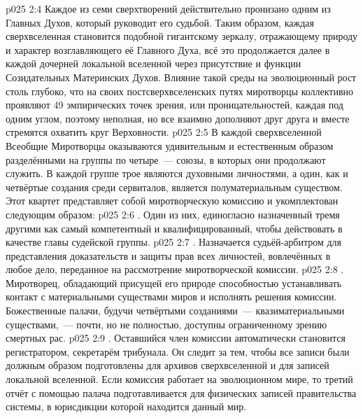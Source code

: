 \vs p025 2:4 Каждое из семи сверхтворений действительно пронизано одним из Главных Духов, который руководит его судьбой. Таким образом, каждая сверхвселенная становится подобной гигантскому зеркалу, отражающему природу и характер возглавляющего её Главного Духа, всё это продолжается далее в каждой дочерней локальной вселенной через присутствие и функции Созидательных Материнских Духов. Влияние такой среды на эволюционный рост столь глубоко, что на своих постсверхвселенских путях миротворцы коллективно проявляют 49 эмпирических точек зрения, или проницательностей, каждая под одним углом, поэтому неполная, но все взаимно дополняют друг друга и вместе стремятся охватить круг Верховности.
\vs p025 2:5 \pc В каждой сверхвселенной Всеобщие Миротворцы оказываются удивительным и естественным образом разделёнными на группы по четыре~--- союзы, в которых они продолжают служить. В каждой группе трое являются духовными личностями, а один, как и четвёртые создания среди сервиталов, является полуматериальным существом. Этот квартет представляет собой миротворческую комиссию и укомплектован следующим образом:
\vs p025 2:6 . Один из них, единогласно назначенный тремя другими как самый компетентный и квалифицированный, чтобы действовать в качестве главы судейской группы.
\vs p025 2:7 . Назначается судьёй\hyp{}арбитром для представления доказательств и защиты прав всех личностей, вовлечённых в любое дело, переданное на рассмотрение миротворческой комиссии.
\vs p025 2:8 . Миротворец, обладающий присущей его природе способностью устанавливать контакт с материальными существами миров и исполнять решения комиссии. Божественные палачи, будучи четвёртыми созданиями~--- квазиматериальными существами,~--- почти, но не полностью, доступны ограниченному зрению смертных рас.
\vs p025 2:9 . Оставшийся член комиссии автоматически становится регистратором, секретарём трибунала. Он следит за тем, чтобы все записи были должным образом подготовлены для архивов сверхвселенной и для записей локальной вселенной. Если комиссия работает на эволюционном мире, то третий отчёт с помощью палача подготавливается для физических записей правительства системы, в юрисдикции которой находится данный мир.
